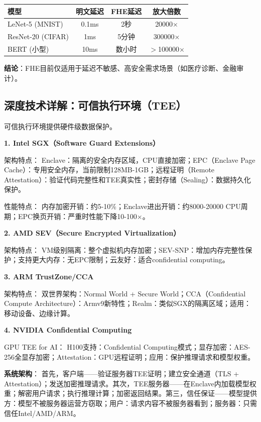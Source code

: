 \begin{table}[H]
\centering
\small
\begin{tabular}{lccc}
\toprule
\textbf{模型} & \textbf{明文延迟} & \textbf{FHE延迟} & \textbf{放大倍数} \\
\midrule
LeNet-5 (MNIST) & 0.1ms & 2秒 & 20000× \\
ResNet-20 (CIFAR) & 1ms & 5分钟 & 300000× \\
BERT (小型) & 10ms & 数小时 & $>$100000× \\
\bottomrule
\end{tabular}
\end{table}

\textbf{结论}：FHE目前仅适用于延迟不敏感、高安全需求场景（如医疗诊断、金融审计）。

\subsection{深度技术详解：可信执行环境（TEE）}

可信执行环境提供硬件级数据保护\cite{IntelSGX2024, AMDSEV2024, ARMTrustZone2024}。

\textbf{1. Intel SGX（Software Guard Extensions）}

架构特点：
Enclave：隔离的安全内存区域，CPU直接加密；EPC（Enclave Page Cache）：专用安全内存，当前限制128MB-1GB；远程证明（Remote Attestation）：验证代码完整性和TEE真实性；密封存储（Sealing）：数据持久化保护。

性能特点：
内存加密开销：约5-10\%；Enclave进出开销：约8000-20000 CPU周期；EPC换页开销：严重时性能下降10-100×。

\textbf{2. AMD SEV（Secure Encrypted Virtualization）}

架构特点：
VM级别隔离：整个虚拟机内存加密；SEV-SNP：增加内存完整性保护；支持更大内存：无EPC限制；云友好：适合confidential computing。

\textbf{3. ARM TrustZone/CCA}

架构特点：
双世界架构：Normal World + Secure World；CCA（Confidential Compute Architecture）：Armv9新特性；Realm：类似SGX的隔离区域；适用：移动设备、边缘计算。

\textbf{4. NVIDIA Confidential Computing}

GPU TEE for AI：
H100支持：Confidential Computing模式；显存加密：AES-256全显存加密；Attestation：GPU远程证明；应用：保护推理请求和模型权重。

\textbf{系统架构}：
首先，客户端——验证服务器TEE证明；建立安全通道（TLS + Attestation）；发送加密推理请求。其次，TEE服务器——在Enclave内加载模型权重；解密用户请求；执行推理计算；加密返回结果。第三，信任保证——模型提供方：模型不被服务器运营方窃取；用户：请求内容不被服务器看到；服务器：只需信任Intel/AMD/ARM。

